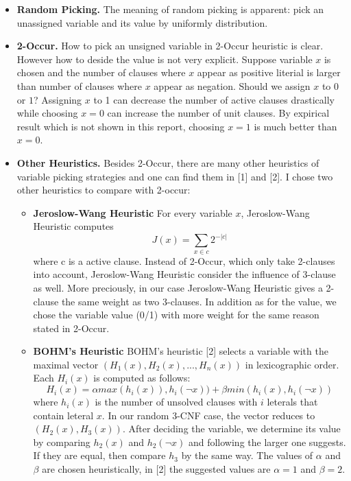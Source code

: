 \documentclass[12pt]{article}
\begin{document}
	\begin{itemize}
		\item \textbf{Random Picking.} The meaning of random picking is apparent: pick an unassigned  variable and its value by uniformly distribution.
		\item \textbf{2-Occur.} How to pick an unsigned  variable in 2-Occur heuristic is clear. However how to deside the value is not very explicit. Suppose variable $x$ is chosen and the number of clauses where $x$ appear as positive literial is larger than number of clauses where $x$ appear as negation. Should we assign $x$ to $0$ or $1$? Assigning $x$ to 1 can decrease the number of active clauses drastically while choosing $x=0$ can increase the number of unit clauses. By expirical result which is not shown in this report, choosing $x=1$ is much better than $x=0$.
		\item \textbf{Other Heuristics.} Besides 2-Occur, there are many other heuristics of variable picking strategies and one can find them in [1] and [2]. I chose two other heuristics to compare with 2-occur:
		\begin{itemize}
			\item \textbf{Jeroslow-Wang Heuristic} For every variable $x$, Jeroslow-Wang Heuristic computes
			$$J(x)=\sum_{x\in c}2^{-|c|}$$
			where c is a active clause. Instead of 2-Occur, which only take 2-clauses into account, Jeroslow-Wang Heuristic consider the influence of 3-clause as well. More preciously, in our case Jeroslow-Wang Heuristic gives a 2-clause the same weight as two 3-clauses. In addition as for the value, we chose the variable value (0/1) with more weight for the same reason stated in 2-Occur.
			\item \textbf{BOHM's Heuristic} BOHM's heuristic [2] selects a variable with the maximal vector $(H_1(x),H_2(x),...,H_n(x))$ in lexicographic order. Each $H_i(x)$ is computed as follows:
			$$
			H_i(x)=\alpha max(h_i(x)),h_i(\neg x))+\beta min(h_i(x),h_i(\neg x))
			$$
			where $h_i(x)$ is the number of unsolved clauses with $i$ leterals that contain leteral $x$. In our random 3-CNF case, the vector reduces to $(H_2(x),H_3(x))$. After deciding the variable, we determine its value by comparing $h_2(x)$ and $h_2(\neg x)$ and following the larger one suggests. If they are equal, then compare $h_3$ by the same way. The values of $\alpha$ and $\beta$ are chosen heuristically, in [2] the suggested values are $\alpha=1$ and $\beta=2$.
		\end{itemize}
	
	\end{itemize}
\end{document}
